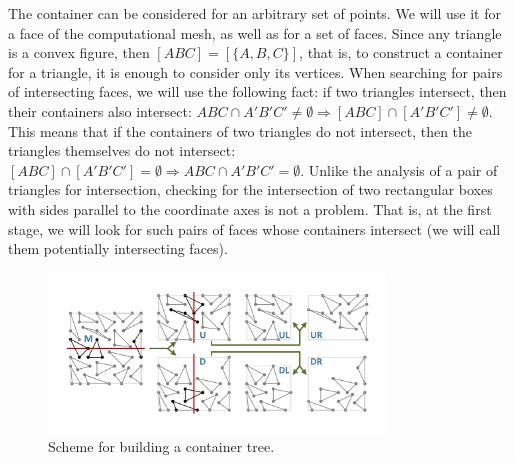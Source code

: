 \documentclass[
11pt,%
tightenlines,%
twoside,%
onecolumn,%
nofloats,%
nobibnotes,%
nofootinbib,%
superscriptaddress,%
noshowpacs,%
centertags]%
{revtex4-2}
\begin{document}
The container can be considered for an arbitrary set of points.
We will use it for a face of the computational mesh, as well as for a set of faces.
Since any triangle is a convex figure, then $[ABC] = [\{A, B, C\}]$, that is, to construct a container for a triangle, it is enough to consider only its vertices.
When searching for pairs of intersecting faces, we will use the following fact: if two triangles intersect, then their containers also intersect: $ABC \cap A'B'C' \ne \emptyset \Rightarrow [ABC] \cap [A'B'C'] \ne\emptyset$.
This means that if the containers of two triangles do not intersect, then the triangles themselves do not intersect: $[ABC] \cap [A'B'C'] = \emptyset \Rightarrow ABC \cap A'B'C' = \emptyset$.
Unlike the analysis of a pair of triangles for intersection, checking for the intersection of two rectangular boxes with sides parallel to the coordinate axes is not a problem.
That is, at the first stage, we will look for such pairs of faces whose containers intersect (we will call them potentially intersecting faces).

\begin{figure}[h]
\includegraphics[width=0.8\textwidth]{pics/pic_box_size.pdf}
\caption{Scheme for building a container tree.}\label{fig:pic_box}
\end{figure}
\end{document}

